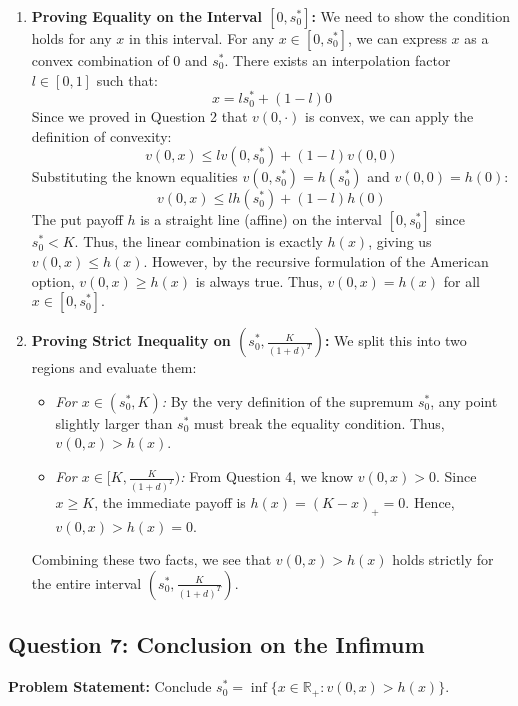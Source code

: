 \begin{enumerate}
    \item \textbf{Proving Equality on the Interval $[0, s_0^*]$:}
    We need to show the condition holds for any $x$ in this interval. For any $x \in [0,s_0^*]$, we can express $x$ as a convex combination of $0$ and $s_0^*$. There exists an interpolation factor $l \in [0,1]$ such that:
    \begin{equation*}
        x = l s_0^* + (1-l)0
    \end{equation*}
    Since we proved in Question 2 that $v(0,\cdot)$ is convex, we can apply the definition of convexity:
    \begin{equation*}
        v(0,x) \le l v(0,s_0^*) + (1-l)v(0,0)
    \end{equation*}
    Substituting the known equalities $v(0,s_0^*) = h(s_0^*)$ and $v(0,0) = h(0)$:
    \begin{equation*}
        v(0,x) \le l h(s_0^*) + (1-l)h(0)
    \end{equation*}
    The put payoff $h$ is a straight line (affine) on the interval $[0, s_0^*]$ since $s_0^* < K$. Thus, the linear combination is exactly $h(x)$, giving us $v(0,x) \le h(x)$.
    However, by the recursive formulation of the American option, $v(0,x) \ge h(x)$ is always true. Thus, $v(0,x) = h(x)$ for all $x \in [0,s_0^*]$.

    \item \textbf{Proving Strict Inequality on $(s_0^*, \frac{K}{(1+d)^T})$:}
    We split this into two regions and evaluate them:
    \begin{itemize}
        \item \textit{For $x \in (s_0^*, K)$:} By the very definition of the supremum $s_0^*$, any point slightly larger than $s_0^*$ must break the equality condition. Thus, $v(0,x) > h(x)$.
        \item \textit{For $x \in [K, \frac{K}{(1+d)^T})$:} From Question 4, we know $v(0,x) > 0$. Since $x \ge K$, the immediate payoff is $h(x) = (K-x)_+ = 0$. Hence, $v(0,x) > h(x) = 0$.
    \end{itemize}
    Combining these two facts, we see that $v(0,x) > h(x)$ holds strictly for the entire interval $(s_0^*, \frac{K}{(1+d)^T})$.
\end{enumerate}

\subsection*{Question 7: Conclusion on the Infimum}

\textbf{Problem Statement:}
Conclude $s_0^* = \inf\{x \in \mathbb{R}_+ : v(0,x) > h(x)\}$.

